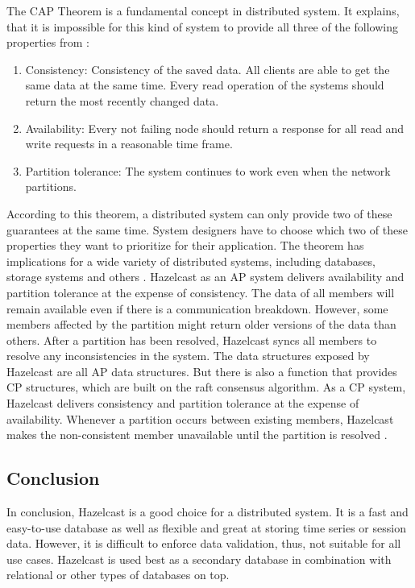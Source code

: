 The CAP Theorem is a fundamental concept in distributed system. It explains, that it is impossible for
this kind of system to provide all three of the following properties from \textcite[23]{Brewer.2012}:

\begin{enumerate}
    \item Consistency: Consistency of the saved data. All clients are able to get the same data at the same time. Every read operation of the systems should return the most recently changed data.
    \item Availability: Every not failing node should return a response for all read and write requests in a reasonable time frame.
    \item Partition tolerance: The system continues to work even when the network partitions.
\end{enumerate}

According to this theorem, a distributed system can only provide two of these guarantees at the same
time. System designers have to choose which two of these properties they want to prioritize for their
application. The theorem has implications for a wide variety of distributed systems, including databases,
storage systems and others \parencite[1]{Brewer.2017}.
Hazelcast as an AP system delivers availability and partition tolerance at the expense of consistency.
The data of all members will remain available even if there is a communication breakdown.
However, some members affected by the partition might return older versions of the data than others.
After a partition has been resolved, Hazelcast syncs all members to resolve any inconsistencies in the
system. The data structures exposed by Hazelcast are all AP data structures.
But there is also a function  that provides CP structures, which are built on the raft consensus algorithm.
As a CP system, Hazelcast  delivers consistency and partition tolerance at the expense of availability.
Whenever a partition occurs between existing members, Hazelcast makes the non-consistent member
unavailable until the partition is resolved \parencite{Hazelcast.05.04.2023}.

\subsection{Conclusion} \label{subsec:conclusionHazelcast}

In conclusion, Hazelcast is a good choice for a distributed system. It is a fast and easy-to-use database as well as
flexible and great at storing time series or session data. However, it is difficult to enforce data validation, thus,
not suitable for all use cases. Hazelcast is used best as a secondary database in combination with relational or other types of databases on top.

